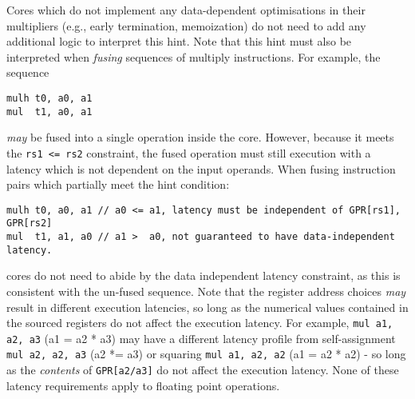 Cores which do not implement any data-dependent optimisations in their
multipliers (e.g., early termination, memoization) do not need to add
any additional logic to interpret this hint.
Note that this hint must also be interpreted when {\em fusing}
sequences of multiply instructions. For example, the sequence
\begin{verbatim}
mulh t0, a0, a1
mul  t1, a0, a1
\end{verbatim}
{\em may} be fused into a single operation inside the core.
However, because it meets the {\tt rs1 <= rs2} constraint, the fused
operation must still execution with a latency which is not dependent on
the input operands.
When fusing instruction pairs which partially meet the hint condition:
\begin{verbatim}
mulh t0, a0, a1 // a0 <= a1, latency must be independent of GPR[rs1], GPR[rs2]
mul  t1, a1, a0 // a1 >  a0, not guaranteed to have data-independent latency.
\end{verbatim}
cores do not need to abide by the data independent latency constraint,
as this is consistent with the un-fused sequence.
Note that the register address choices {\em may} result in different
execution latencies, so long as the numerical values contained in the
sourced registers do not affect the execution latency.
For example,
{\tt mul a1, a2, a3} (a1 = a2 * a3)
may have a different latency profile from self-assignment
{\tt mul a2, a2, a3} (a2 *= a3)
or squaring
{\tt mul a1, a2, a2} (a1 = a2 * a2) - 
so long as the {\em contents} of {\tt GPR[a2/a3]} do not affect
the execution latency.
None of these latency requirements apply to floating point operations.

